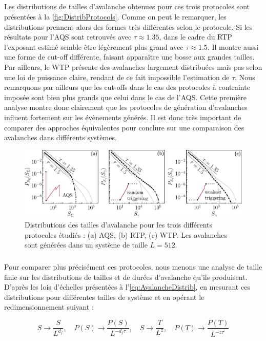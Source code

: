 \subparagraph{}Les distributions de tailles d'avalanche obtenues pour ces trois protocoles sont présentées à la \autoref{fig:DistribProtocols}. Comme on peut le remarquer, les distributions prennent alors des formes très différentes selon le protocole. Si les résultats pour l'AQS sont retrouvés avec $\tau\approx 1.35$, dans le cadre du RTP l'exposant estimé semble être légèrement plus grand avec $\tau \approx 1.5$. Il montre aussi une forme de cut-off différente, faisant apparaître une bosse aux grandes tailles. Par ailleurs, le WTP présente des avalanches largement distribuées mais pas selon une loi de puissance claire, rendant de ce fait impossible l'estimation de $\tau$. Nous remarquons par ailleurs que les cut-offs dans le cas des protocoles à contrainte imposée sont bien plus grands que celui dans le cas de l'AQS. Cette première analyse montre donc clairement que les protocoles de génération d'avalanches influent fortement sur les évènements générés. Il est donc très important de comparer des approches équivalentes pour conclure sur une comparaison des avalanches dans différents systèmes.

\begin{figure}[h]
	\centering
	\includegraphics[width=\textwidth]{Chapitre4/Figures/Avalanches/Comparaison_Distrib.pdf}
	\caption{Distributions des tailles d'avalanche pour les trois différents protocoles étudiés : (a) AQS, (b) RTP, (c) WTP. Les avalanches sont générées dans un système de taille $L=512$.}
	\label{fig:DistribProtocols}
\end{figure}

\subparagraph{}Pour comparer plus précisément ces protocoles, nous menons une analyse de taille finie sur les distributions de tailles et de durées d'avalanche qu'ils produisent. D'après les lois d'échelles présentées à l'\autoref{eq:AvalancheDistrib}, en mesurant ces distributions pour différentes tailles de système et en opérant le redimensionnement suivant :

\begin{equation}
	S \rightarrow \frac{S}{L^{d_f}}, \quad P(S) \rightarrow \frac{P(S)}{L^{-d_f\tau}},\quad S \rightarrow \frac{T}{L^{z}}, \quad P(T) \rightarrow \frac{P(T)}{L^{-z\tau^\prime}}
\end{equation}

